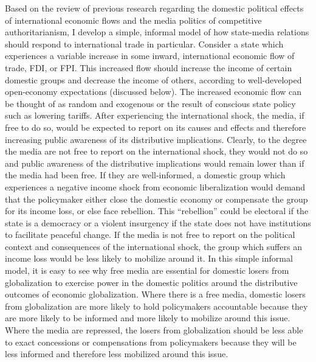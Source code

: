 \documentclass[12pt,a4paper]{article}
\begin{document}
Based on the review of previous research regarding the domestic political effects of international economic flows and the media politics of competitive authoritarianism, I develop a simple, informal model of how state-media relations should respond to international trade in particular. Consider a state which experiences a variable increase in some inward, international economic flow of trade, FDI, or FPI. This increased flow should increase the income of certain domestic groups and decrease the income of others, according to well-developed open-economy expectations (discussed below). The increased economic flow can be thought of as random and exogenous or the result of conscious state policy such as lowering tariffs. After experiencing the international shock, the media, if free to do so, would be expected to report on its causes and effects and therefore increasing public awareness of its distributive implications. Clearly, to the degree the media are not free to report on the international shock, they would not do so and public awareness of the distributive implications would remain lower than if the media had been free. If they are well-informed, a domestic group which experiences a negative income shock from economic liberalization would demand that the policymaker either close the domestic economy or compensate the group for its income loss, or else face rebellion. This “rebellion” could be electoral if the state is a democracy or a violent insurgency if the state does not have institutions to facilitate peaceful change. If the media is not free to report on the political context and consequences of the international shock, the group which suffers an income loss would be less likely to mobilize around it. In this simple informal model, it is easy to see why free media are essential for domestic losers from globalization to exercise power in the domestic politics around the distributive outcomes of economic globalization. Where there is a free media, domestic losers from globalization are more likely to hold policymakers accountable because they are more likely to be informed and more likely to mobilize around this issue. Where the media are repressed, the losers from globalization should be less able to exact concessions or compensations from policymakers because they will be less informed and therefore less mobilized around this issue.
\end{document}
